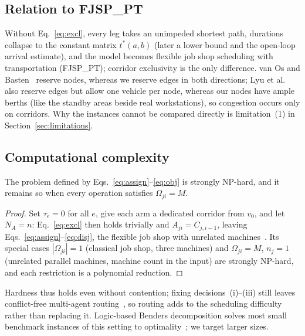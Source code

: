 \subsection{Relation to FJSP\_PT}
\label{sec:fjsppt}

Without Eq.~\eqref{eq:excl}, every leg takes an unimpeded shortest path, durations collapse to the constant matrix $t^{*}(a,b)$ (later a lower bound and the open-loop arrival estimate), and the model becomes flexible job shop scheduling with transportation (FJSP\_PT); corridor exclusivity is the only difference.
van Os and Basten~\cite{vanos2026exact} reserve nodes, whereas we reserve edges in both directions; Lyu et al.~\cite{lyu2019approach} also reserve edges but allow one vehicle per node, whereas our nodes have ample berths (like the standby areas beside real workstations), so congestion occurs only on corridors.
Why the instances cannot be compared directly is limitation~(1) in Section~\ref{sec:limitations}.

\subsection{Computational complexity}

\begin{prop}
\label{prop:np_hard}
The problem defined by Eqs.~\eqref{eq:assign}--\eqref{eq:obj} is strongly NP-hard, and it remains so when every operation satisfies
$\Omega_{ji}=M$.
\end{prop}

\begin{proof}
Set $\tau_e=0$ for all $e$, give each arm a dedicated corridor from $v_0$, and let $N_A=n$: Eq.~\eqref{eq:excl} then holds trivially and $A_{ji}=C_{j,i-1}$, leaving Eqs.~\eqref{eq:assign}--\eqref{eq:disj}, the flexible job shop with unrelated machines~\cite{dauzereperes2024fjsp}.
Its special cases $|\Omega_{ji}|=1$ (classical job shop, three machines) and $\Omega_{ji}=M$, $n_j=1$ (unrelated parallel machines, machine count in the input) are strongly NP-hard, and each restriction is a polynomial reduction.
\end{proof}

Hardness thus holds even without contention; fixing decisions~(i)--(iii) still leaves conflict-free multi-agent routing~\cite{gao2023mapf}, so routing adds to the scheduling difficulty rather than replacing it.
Logic-based Benders decomposition solves most small benchmark instances of this setting to optimality~\cite{vanos2026exact}; we target larger sizes.

